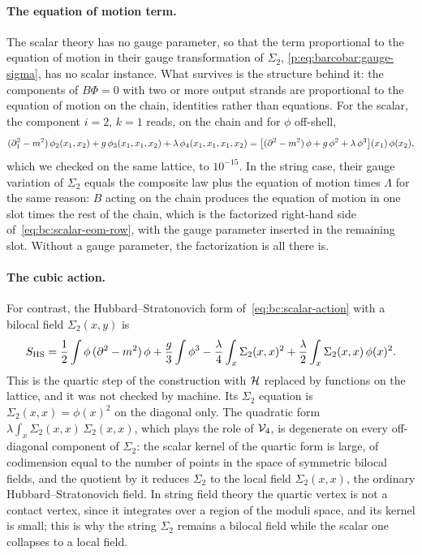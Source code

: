 \paragraph{The equation of motion term.}
The scalar theory has no gauge parameter, so that the term proportional to the equation of motion in their gauge transformation of $\Sigma_2$, \eqref{p:eq:barcobar:gauge-sigma}, has no scalar instance.
What survives is the structure behind it: the components of $B \Phi = 0$ with two or more output strands are proportional to the equation of motion on the chain, identities rather than equations.
For the scalar, the component $i = 2$, $k = 1$ reads, on the chain and for $\phi$ off-shell,
\begin{equation}
  \label{eq:bc:scalar-eom-row}
  (\partial_1^2 - m^2) \, \phi_2(x_1, x_2)
    + g \, \phi_3(x_1, x_1, x_2)
    + \lambda \, \phi_4(x_1, x_1, x_1, x_2)
    = \big[ (\partial^2 - m^2) \, \phi + g \, \phi^2 + \lambda \, \phi^3 \big](x_1) \, \phi(x_2),
\end{equation}
which we checked on the same lattice, to $10^{-15}$.
In the string case, their gauge variation of $\Sigma_2$ equals the composite law plus the equation of motion times $\Lambda$ for the same reason: $B$ acting on the chain produces the equation of motion in one slot times the rest of the chain, which is the factorized right-hand side of~\eqref{eq:bc:scalar-eom-row}, with the gauge parameter inserted in the remaining slot.
Without a gauge parameter, the factorization is all there is.

\paragraph{The cubic action.}
For contrast, the Hubbard--Stratonovich form of~\eqref{eq:bc:scalar-action} with a bilocal field $\Sigma_2(x, y)$ is
\begin{equation}
  S_{\mathrm{HS}}
    = \frac{1}{2} \int \phi \, (\partial^2 - m^2) \, \phi
      + \frac{g}{3} \int \phi^3
      - \frac{\lambda}{4} \int_x \Sigma_2(x, x)^2
      + \frac{\lambda}{2} \int_x \Sigma_2(x, x) \, \phi(x)^2.
\end{equation}
This is the quartic step of the construction with $\mathcal{H}$ replaced by functions on the lattice, and it was not checked by machine.
Its $\Sigma_2$ equation is $\Sigma_2(x, x) = \phi(x)^2$ on the diagonal only.
The quadratic form $\lambda \int_x \Sigma_2(x, x) \, \Sigma_2(x, x)$, which plays the role of $\mathcal{V}_{4}$, is degenerate on every off-diagonal component of $\Sigma_2$: the scalar kernel of the quartic form is large, of codimension equal to the number of points in the space of symmetric bilocal fields, and the quotient by it reduces $\Sigma_2$ to the local field $\Sigma_2(x, x)$, the ordinary Hubbard--Stratonovich field.
In string field theory the quartic vertex is not a contact vertex, since it integrates over a region of the moduli space, and its kernel is small; this is why the string $\Sigma_2$ remains a bilocal field while the scalar one collapses to a local field.
